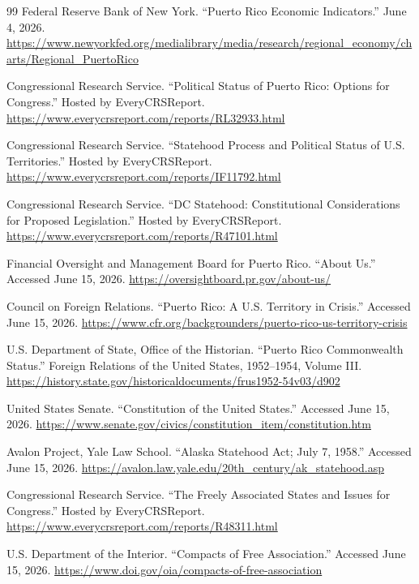 \documentclass[11pt,a4paper]{article}
\begin{document}
\begin{thebibliography}{99}
Federal Reserve Bank of New York. ``Puerto Rico Economic Indicators.'' June 4, 2026.
\url{https://www.newyorkfed.org/medialibrary/media/research/regional_economy/charts/Regional_PuertoRico}

Congressional Research Service. ``Political Status of Puerto Rico: Options for Congress.'' Hosted by EveryCRSReport.
\url{https://www.everycrsreport.com/reports/RL32933.html}

Congressional Research Service. ``Statehood Process and Political Status of U.S. Territories.'' Hosted by EveryCRSReport.
\url{https://www.everycrsreport.com/reports/IF11792.html}

Congressional Research Service. ``DC Statehood: Constitutional Considerations for Proposed Legislation.'' Hosted by EveryCRSReport.
\url{https://www.everycrsreport.com/reports/R47101.html}

Financial Oversight and Management Board for Puerto Rico. ``About Us.'' Accessed June 15, 2026.
\url{https://oversightboard.pr.gov/about-us/}

Council on Foreign Relations. ``Puerto Rico: A U.S. Territory in Crisis.'' Accessed June 15, 2026.
\url{https://www.cfr.org/backgrounders/puerto-rico-us-territory-crisis}

U.S. Department of State, Office of the Historian. ``Puerto Rico Commonwealth Status.'' Foreign Relations of the United States, 1952--1954, Volume III.
\url{https://history.state.gov/historicaldocuments/frus1952-54v03/d902}

United States Senate. ``Constitution of the United States.'' Accessed June 15, 2026.
\url{https://www.senate.gov/civics/constitution_item/constitution.htm}

Avalon Project, Yale Law School. ``Alaska Statehood Act; July 7, 1958.'' Accessed June 15, 2026.
\url{https://avalon.law.yale.edu/20th_century/ak_statehood.asp}

Congressional Research Service. ``The Freely Associated States and Issues for Congress.'' Hosted by EveryCRSReport.
\url{https://www.everycrsreport.com/reports/R48311.html}

U.S. Department of the Interior. ``Compacts of Free Association.'' Accessed June 15, 2026.
\url{https://www.doi.gov/oia/compacts-of-free-association}


\end{thebibliography}
\end{document}
